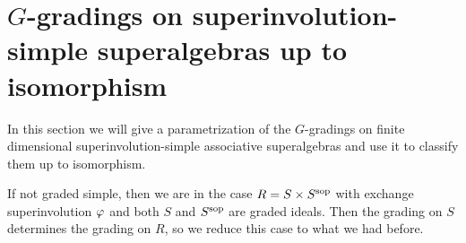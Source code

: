 
\section{$G$-gradings on superinvolution-simple superalgebras up to isomorphism}

In this section we will give a parametrization of the $G$-gradings on finite dimensional superinvolution-simple associative superalgebras and use it to classify them up to isomorphism. 

If not graded simple, then we are in the case $R = S\times S^{\mathrm{sop}}$ with exchange superinvolution $\varphi$ and both $S$ and $S^{\mathrm{sop}}$ are graded ideals. 
Then the grading on $S$ determines the grading on $R$, so we reduce this case to what we had before.




